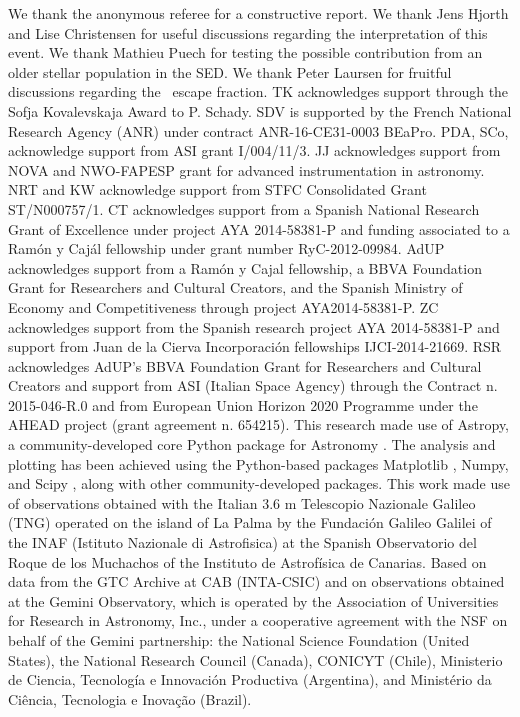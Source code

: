 \documentclass{aa}    %
\begin{document}
\begin{acknowledgements}
We thank the anonymous referee for a constructive report. 
%
We thank Jens Hjorth and Lise Christensen for useful discussions regarding the interpretation of this event. We thank Mathieu Puech for testing the possible contribution from an older stellar population in the SED. We thank Peter Laursen for fruitful discussions regarding the \lya~escape fraction.
%	
TK acknowledges support through the Sofja Kovalevskaja Award to P. Schady.
%
SDV is supported by the French National Research Agency (ANR) under contract ANR-16-CE31-0003 BEaPro.
%
PDA, SCo, acknowledge support from ASI grant I/004/11/3.
%
JJ acknowledges support from NOVA and NWO-FAPESP grant for advanced
instrumentation in astronomy.
%
NRT and KW acknowledge support from STFC Consolidated
Grant ST/N000757/1.
%
CT acknowledges support from a Spanish National Research Grant of Excellence
under project AYA 2014-58381-P and funding associated to a Ramón y Cajál
fellowship under grant number RyC-2012-09984.
%
AdUP acknowledges support from a Ramón y Cajal fellowship, a BBVA Foundation
Grant for Researchers and Cultural Creators, and the Spanish Ministry of Economy
and Competitiveness through project AYA2014-58381-P.
%
ZC acknowledges support from the Spanish research project AYA 2014-58381-P and
support from Juan de la Cierva Incorporaci\'on fellowships IJCI-2014-21669.
%
RSR acknowledges AdUP's BBVA Foundation Grant for Researchers and Cultural
Creators and support from ASI (Italian Space Agency) through the Contract n. 2015-046-R.0 and from European Union Horizon 2020 Programme under the AHEAD project (grant agreement n. 654215).
%
This research made use of Astropy, a community-developed core Python package for Astronomy \citep{TheAstropyCollaboration2013}. The analysis and plotting has been achieved using the Python-based packages Matplotlib \citep{Hunter2007}, Numpy, and Scipy \citep{VanderWalt2011}, along with other community-developed packages.
%
This work made use of observations obtained with the Italian 3.6 m Telescopio Nazionale Galileo (TNG) operated on the island of La Palma by the Fundaci\'on Galileo Galilei of the INAF (Istituto Nazionale di Astrofisica) at the Spanish Observatorio del Roque de los Muchachos of the Instituto de Astrof\'isica de Canarias.
%
Based on data from the GTC Archive at CAB (INTA-CSIC) and on observations obtained at the Gemini Observatory, which is operated by the Association of Universities for Research in Astronomy, Inc., under a cooperative agreement with the NSF on behalf of the Gemini partnership: the National Science Foundation (United States), the National Research Council (Canada), CONICYT (Chile), Ministerio de Ciencia, Tecnología e Innovación Productiva (Argentina), and Ministério da Ciência, Tecnologia e Inovação (Brazil).

\end{acknowledgements}



\end{document}
